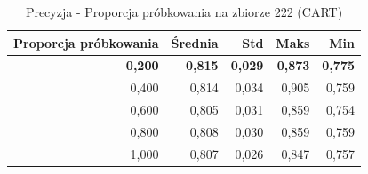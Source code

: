 \begin{table}[htbp]
\centering
\small
\setlength{\tabcolsep}{6pt}
\renewcommand{\arraystretch}{1.2}
\caption{Precyzja - Proporcja próbkowania na zbiorze 222 (CART)}
\label{tab:CART_sample_ratio_222_precision}
\begin{tabular}{r|r|r|r|r}
\toprule
Proporcja próbkowania & Średnia & Std & Maks & Min \\
\hline
\textbf{0,200} & \textbf{0,815} & \textbf{0,029} & \textbf{0,873} & \textbf{0,775} \\
0,400 & 0,814 & 0,034 & 0,905 & 0,759 \\
0,600 & 0,805 & 0,031 & 0,859 & 0,754 \\
0,800 & 0,808 & 0,030 & 0,859 & 0,759 \\
1,000 & 0,807 & 0,026 & 0,847 & 0,757 \\
\bottomrule
\end{tabular}
\end{table}
